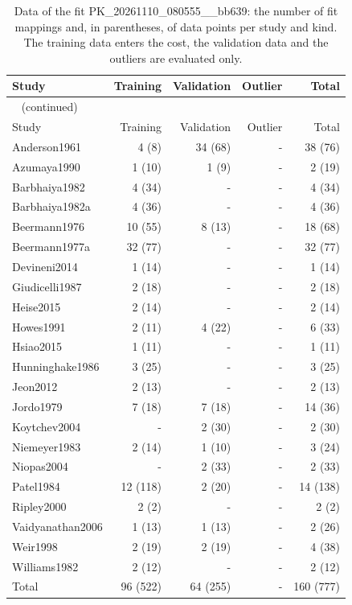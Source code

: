 \documentclass{article}
\begin{document}
\begin{longtable}{lrrrr}
\caption{Data of the fit PK\_20261110\_080555\_\_bb639: the number of fit mappings and, in parentheses, of data points per study and kind. The training data enters the cost, the validation data and the outliers are evaluated only.}\label{tab:data:PK_20261110_080555__bb639} \\
\toprule
Study & Training & Validation & Outlier & Total \\
\midrule
\endfirsthead
\multicolumn{5}{l}{\small\tablename~\thetable{} (continued)} \\
\toprule
Study & Training & Validation & Outlier & Total \\
\midrule
\endhead
\bottomrule
\endlastfoot
Anderson1961 & 4 (8) & 34 (68) & - & 38 (76) \\
Azumaya1990 & 1 (10) & 1 (9) & - & 2 (19) \\
Barbhaiya1982 & 4 (34) & - & - & 4 (34) \\
Barbhaiya1982a & 4 (36) & - & - & 4 (36) \\
Beermann1976 & 10 (55) & 8 (13) & - & 18 (68) \\
Beermann1977a & 32 (77) & - & - & 32 (77) \\
Devineni2014 & 1 (14) & - & - & 1 (14) \\
Giudicelli1987 & 2 (18) & - & - & 2 (18) \\
Heise2015 & 2 (14) & - & - & 2 (14) \\
Howes1991 & 2 (11) & 4 (22) & - & 6 (33) \\
Hsiao2015 & 1 (11) & - & - & 1 (11) \\
Hunninghake1986 & 3 (25) & - & - & 3 (25) \\
Jeon2012 & 2 (13) & - & - & 2 (13) \\
Jordo1979 & 7 (18) & 7 (18) & - & 14 (36) \\
Koytchev2004 & - & 2 (30) & - & 2 (30) \\
Niemeyer1983 & 2 (14) & 1 (10) & - & 3 (24) \\
Niopas2004 & - & 2 (33) & - & 2 (33) \\
Patel1984 & 12 (118) & 2 (20) & - & 14 (138) \\
Ripley2000 & 2 (2) & - & - & 2 (2) \\
Vaidyanathan2006 & 1 (13) & 1 (13) & - & 2 (26) \\
Weir1998 & 2 (19) & 2 (19) & - & 4 (38) \\
Williams1982 & 2 (12) & - & - & 2 (12) \\
Total & 96 (522) & 64 (255) & - & 160 (777) \\
\end{longtable}
\end{document}
